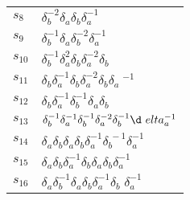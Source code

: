 \documentclass{article}
\begin{document}
\begin{center}
\begin{tabular}{ll}
$s_{8}$ & $\delta_b^{-2}\delta_a^{}\delta_b^{}\delta_a^{-1}$ \\
$s_{9}$ & $\delta_b^{-1}\delta_a^{}\delta_b^{-2}\delta_a^{-1}$ \\
$s_{10}$ & $\delta_b^{-1}\delta_a^{2}\delta_b^{}\delta_a^{-2}\delta_b^{}$ \\
$s_{11}$ & $\delta_b^{}\delta_a^{-1}\delta_b^{}\delta_a^{-2}\delta_b^{}\delta_a\
^{-1}$ \\
$s_{12}$ & $\delta_b^{}\delta_a^{-1}\delta_b^{-1}\delta_a^{}\delta_b^{}$ \\
$s_{13}$ & $\delta_b^{-1}\delta_a^{-1}\delta_b^{-1}\delta_a^{-2}\delta_b^{-1}\d\
elta_a^{-1}$ \\
$s_{14}$ & $\delta_a^{}\delta_b^{}\delta_a^{}\delta_b^{}\delta_a^{-1}\delta_b^{\
-1}\delta_a^{-1}$ \\
$s_{15}$ & $\delta_a^{}\delta_b^{}\delta_a^{-1}\delta_b^{}\delta_a^{}\delta_b^{\
}\delta_a^{-1}$ \\
$s_{16}$ & $\delta_a^{}\delta_b^{-1}\delta_a^{}\delta_b^{}\delta_a^{-1}\delta_b\
^{}\delta_a^{-1}$ \\
\bottomrule
\end{tabular}
\end{center}

\thispagestyle{empty}
\end{document}
